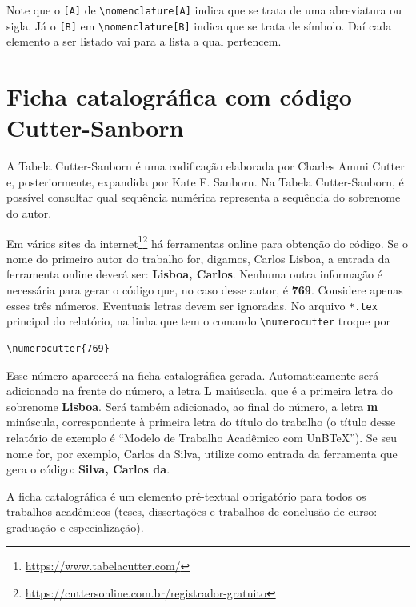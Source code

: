 Note que o \verb|[A]| de \verb|\nomenclature[A]| indica que se trata de uma abreviatura ou sigla. Já o \verb|[B]| em \verb|\nomenclature[B]| indica que se trata de símbolo. Daí cada elemento a ser listado vai para a lista a qual pertencem.

\section{Ficha catalográfica com código Cutter-Sanborn}
A Tabela Cutter-Sanborn é uma codificação elaborada por Charles Ammi Cutter e, posteriormente, expandida por Kate F. Sanborn. Na Tabela Cutter-Sanborn, é possível consultar qual sequência numérica representa a sequência do sobrenome do autor.

Em vários sites da internet\footnote{\url{https://www.tabelacutter.com/}}\footnote{\url{https://cuttersonline.com.br/registrador-gratuito}} há ferramentas online para obtenção do código. Se o nome do primeiro autor do trabalho for, digamos, Carlos Lisboa, a entrada da ferramenta online deverá ser: \textbf{Lisboa, Carlos}. Nenhuma outra informação é necessária para gerar o código que, no caso desse autor, é \textbf{769}. Considere apenas esses três números. Eventuais letras devem ser ignoradas. No arquivo \verb|*.tex| principal do relatório, na linha que tem o comando \verb|\numerocutter| troque por

\begin{verbatim}
\numerocutter{769}
\end{verbatim}

Esse número aparecerá na ficha catalográfica gerada. Automaticamente será adicionado na frente do número, a letra \textbf{L} maiúscula, que é a primeira letra do sobrenome \textbf{Lisboa}. Será também adicionado, ao final do número, a letra \textbf{m} minúscula, correspondente à primeira letra do título do trabalho (o título desse relatório de exemplo é ``Modelo de Trabalho Acadêmico com UnB\TeX''). Se seu nome for, por exemplo, Carlos da Silva, utilize como entrada da ferramenta que gera o código: \textbf{Silva, Carlos da}.

A ficha catalográfica é um elemento pré-textual obrigatório para todos os trabalhos acadêmicos (teses, dissertações e trabalhos de conclusão de curso: graduação e especialização).